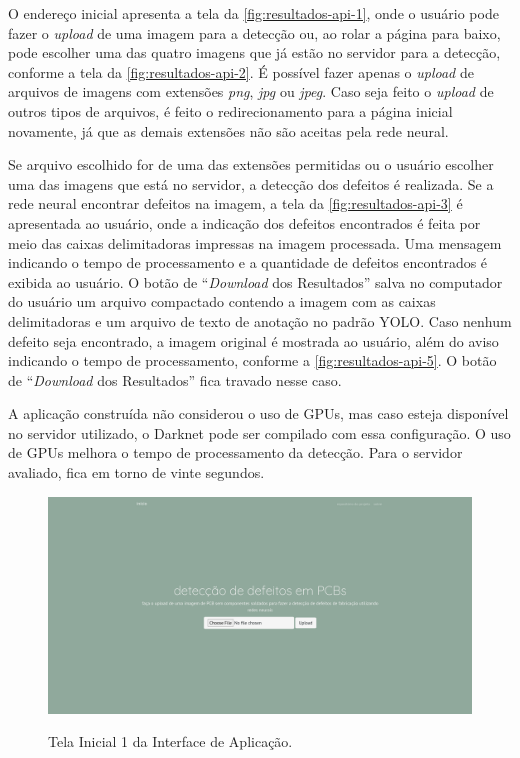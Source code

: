 \begin{figure}[H]
  \label{fig:resultados-api-etapas}
\end{figure}

O endereço inicial apresenta a tela da \autoref{fig:resultados-api-1}, onde o usuário pode fazer o \textit{upload} de uma imagem para a detecção ou, ao rolar a página para baixo, pode escolher uma das quatro imagens que já estão no servidor para a detecção, conforme a tela da \autoref{fig:resultados-api-2}. É possível fazer apenas o \textit{upload} de arquivos de imagens com extensões \textit{png}, \textit{jpg} ou \textit{jpeg}. Caso seja feito o \textit{upload} de outros tipos de arquivos, é feito o redirecionamento para a página inicial novamente, já que as demais extensões não são aceitas pela rede neural.

Se arquivo escolhido for de uma das extensões permitidas ou o usuário escolher uma das imagens que está no servidor, a detecção dos defeitos é realizada. Se a rede neural encontrar defeitos na imagem, a tela da \autoref{fig:resultados-api-3} é apresentada ao usuário, onde a indicação dos defeitos encontrados é feita por meio das caixas delimitadoras impressas na imagem processada. Uma mensagem indicando o tempo de processamento e a quantidade de defeitos encontrados é exibida ao usuário. O botão de ``\textit{Download} dos Resultados'' salva no computador do usuário um arquivo compactado contendo a imagem com as caixas delimitadoras e um arquivo de texto de anotação no padrão YOLO. Caso nenhum defeito seja encontrado, a imagem original é mostrada ao usuário, além do aviso indicando o tempo de processamento, conforme a \autoref{fig:resultados-api-5}. O botão de ``\textit{Download} dos Resultados'' fica travado nesse caso.

A aplicação construída não considerou o uso de GPUs, mas caso esteja disponível no servidor utilizado, o Darknet pode ser compilado com essa configuração. O uso de GPUs melhora o tempo de processamento da detecção. Para o servidor avaliado, fica em torno de vinte segundos.

\begin{landscape}
  \begin{figure}[H] %
    \centering
    \caption{Tela Inicial 1 da Interface de Aplicação.}
    \includegraphics[scale=0.36]{img/api/1.png}
    \label{fig:resultados-api-1}
  \end{figure}
\end{landscape}

